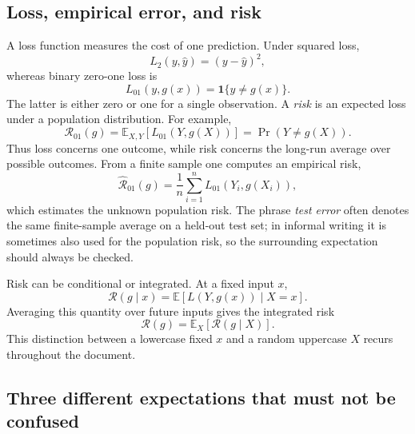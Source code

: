 \documentclass[11pt,a4paper]{article}
\newcommand{\R}{\mathcal R}
\newcommand{\ind}{\mathbf{1}}
\begin{document}
\subsection{Loss, empirical error, and risk}

A loss function measures the cost of one prediction. Under squared loss,
\begin{equation}
  L_{2}(y,\widehat y)=(y-\widehat y)^2,
\end{equation}
whereas binary zero-one loss is
\begin{equation}
  L_{01}(y,g(x))=\ind\{y\neq g(x)\}.
\end{equation}
The latter is either zero or one for a single observation. A \emph{risk} is an expected loss under a population distribution. For example,
\begin{equation}
  \R_{01}(g)
  =\mathbb E_{X,Y}[L_{01}(Y,g(X))]
  =\Pr(Y\neq g(X)).
\end{equation}
Thus loss concerns one outcome, while risk concerns the long-run average over possible outcomes. From a finite sample one computes an empirical risk,
\begin{equation}
  \widehat{\R}_{01}(g)
  =\frac{1}{n}\sum_{i=1}^{n}L_{01}(Y_i,g(X_i)),
\end{equation}
which estimates the unknown population risk. The phrase \emph{test error} often denotes the same finite-sample average on a held-out test set; in informal writing it is sometimes also used for the population risk, so the surrounding expectation should always be checked.

Risk can be conditional or integrated. At a fixed input $x$,
\begin{equation}
  \R(g\mid x)=\mathbb E[L(Y,g(x))\mid X=x].
\end{equation}
Averaging this quantity over future inputs gives the integrated risk
\begin{equation}
  \R(g)=\mathbb E_X[\R(g\mid X)].
\end{equation}
This distinction between a lowercase fixed $x$ and a random uppercase $X$ recurs throughout the document.

\subsection{Three different expectations that must not be confused}
\end{document}
